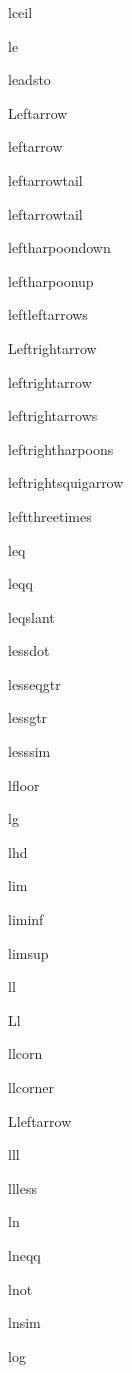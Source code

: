 \documentclass{article}
\begin{document}
lceil    \lceil{}

le    \le{}

leadsto    \leadsto{}

Leftarrow    \Leftarrow{}

leftarrow    \leftarrow{}

leftarrowtail    \leftarrowtail{}

leftarrowtail    \leftarrowtail{}

leftharpoondown    \leftharpoondown{}

leftharpoonup    \leftharpoonup{}

leftleftarrows    \leftleftarrows{}

Leftrightarrow    \Leftrightarrow{}

leftrightarrow    \leftrightarrow{}

leftrightarrows    \leftrightarrows{}

leftrightharpoons    \leftrightharpoons{}

leftrightsquigarrow    \leftrightsquigarrow{}

leftthreetimes    \leftthreetimes{}

leq    \leq{}

leqq    \leqq{}

leqslant    \leqslant{}

lessdot    \lessdot{}

lesseqgtr    \lesseqgtr{}

lessgtr    \lessgtr{}

lesssim    \lesssim{}

lfloor    \lfloor{}

lg    \lg{}

lhd    \lhd{}

lim    \lim{}

liminf    \liminf{}

limsup    \limsup{}

ll    \ll{}

Ll    \Ll{}

llcorn    \llcorn{}

llcorner    \llcorner{}

Lleftarrow    \Lleftarrow{}

lll    \lll{}

llless    \llless{}

ln    \ln{}

lneqq    \lneqq{}

lnot    \lnot{}

lnsim    \lnsim{}

log    \log{}
\end{document}
